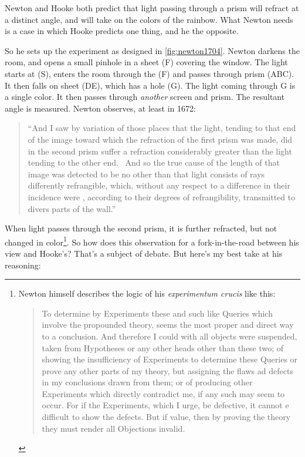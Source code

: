 \begin{refsection}
Newton and Hooke both predict that light passing through a prism will refract at a distinct angle, and will take on the colors of the rainbow. What Newton needs is a case in which Hooke predicts one thing, and he the opposite. 

So he sets up the experiment as designed in \ref{fig:newton1704}. Newton darkens the room, and opens a small pinhole in a sheet (F) covering the window. The light starts at (S), enters the room through the (F) and passes through prism (ABC). It then falls on sheet (DE), which has a hole (G). The light coming through G is a single color. It then passes through \emph{another} screen and prism. The resultant angle is measured. Newton observes, at least in 1672:

\begin{quote}

“And I saw by variation of those places that the light, tending to that end of the image toward which the refraction of the first prism was made, did in the second prism suffer a refraction considerably greater than the light tending to the other end.  And so the true cause of the length of that image was detected to be no other than that light consists of rays differently refrangible, which, without any respect to a difference in their incidence were , according to their degrees of refrangibility, transmitted to divers parts of the wall.”
\end{quote}

When light passes through the second prism, it is further refracted, but not changed in color\footnote{Newton himself describes the logic of his \emph{experimentum crucis} like this:

\begin{quote}

To determine by Experiments these and such like Queries which involve the propounded theory, seems the most proper and direct way to a conclusion. And therefore I could with all objects were suspended, taken from Hypotheses or any other heads other than these two; of showing the insufficiency of Experiments to determine these Queries or prove any other parts of my theory, but assigning the flaws ad defects in my conclusions drawn from them; or of producing other Experiments which directly contradict me, if any such may seem to occur. For if the Experiments, which I urge, be defective, it cannot e difficult to show the defects. But if value, then by proving the theory they must render all Objections invalid. ~\citep[p. 5005]{Newton:1672tm}
\end{quote}}. So how does this observation for a fork-in-the-road between his view and Hooke’s? That’s a subject of debate. But here’s my best take at his reasoning:


\end{refsection}
